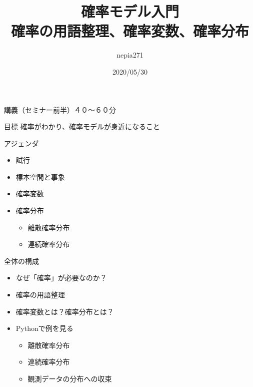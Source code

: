 \documentclass[dvipdfmx,cjk]{beamer}
\title{確率モデル入門\\確率の用語整理、確率変数、確率分布}
\author{nepia271}
\institute{Liberal Arts for Tech}
\date{2020/05/30}
\begin{document}
\begin{frame}
  \titlepage
\end{frame}




\begin{frame}{講義（セミナー前半）４０〜６０分}\pause

\begin{block}{目標}
    確率がわかり、確率モデルが身近になること
\end{block}
\pause

\vskip 1cm

\begin{block}{アジェンダ}
    \begin{itemize}
    \item 試行
    \item 標本空間と事象
    \item 確率変数
    \item 確率分布
        \begin{itemize}
        \item 離散確率分布
        \item 連続確率分布
        \end{itemize}
    \end{itemize}
\end{block}

\end{frame}


\begin{frame}{全体の構成}

\begin{itemize}
    \item なぜ「確率」が必要なのか？
    \item 確率の用語整理
    \item 確率変数とは？確率分布とは？
    \item Pythonで例を見る
        \begin{itemize}
        \item 離散確率分布
        \item 連続確率分布
        \item 観測データの分布への収束
        \end{itemize}
\end{itemize}

\end{frame}
\end{document}
